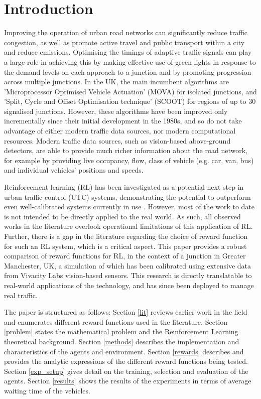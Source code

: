 \documentclass[conference]{IEEEtran}
\begin{document}
\section{Introduction}
Improving the operation of urban road networks can significantly reduce traffic congestion, as well as promote active travel and public transport within a city and reduce emissions.
Optimising the timings of adaptive traffic signals can play a large role in achieving this by making effective use of green lights in response to the demand levels on each approach to a junction and by promoting progression across multiple junctions.
In the UK, the main incumbent algorithms are 'Microprocessor Optimised Vehicle Actuation' (MOVA) \cite{MOVA} for isolated junctions, and 'Split, Cycle and Offset Optimisation technique' (SCOOT) \cite{SCOOT} for regions of  up to 30 signalised junctions.
However, these algorithms have been improved only incrementally since their initial development in the 1980s, and so do not take advantage of either modern traffic data sources, nor modern computational resources. Modern traffic data sources, such as vision-based above-ground detectors, are able to provide much richer information about the road network, for example by providing live occupancy, flow, class of vehicle (e.g. car, van, bus) and individual vehicles' positions and speeds.

Reinforcement learning (RL) has been investigated as a potential next step in urban traffic control (UTC) systems, demonstrating the potential to outperform even well-calibrated systems currently in use \cite{wei2019a}.
However, most of the work to date is not intended to be directly applied to the real world. As such, all observed works in the literature overlook operational limitations of this application of RL.
Further, there is a gap in the literature regarding the choice of reward function for such an RL system, which is a critical aspect.
This paper provides a robust comparison of reward functions for RL, in the context of a junction in Greater Manchester, UK, a simulation of which has been calibrated using extensive data from Vivacity Labs vision-based sensors.
This research is directly translatable to real-world applications of the technology, and has since been deployed to manage real traffic. 

The paper is structured as follows: Section \ref{lit} reviews earlier work in the field and enumerates different reward functions used in the literature.
Section \ref{problem} states the mathematical problem and the Reinforcement Learning theoretical background.
Section \ref{methods} describes the implementation and characteristics of the agents and environment.
Section \ref{rewards} describes and provides the analytic expressions of the different reward functions being tested.
Section \ref{exp_setup} gives detail on the training, selection and evaluation of the agents.
Section \ref{results} shows the results of the experiments in terms of average waiting time of the vehicles.
\end{document}
